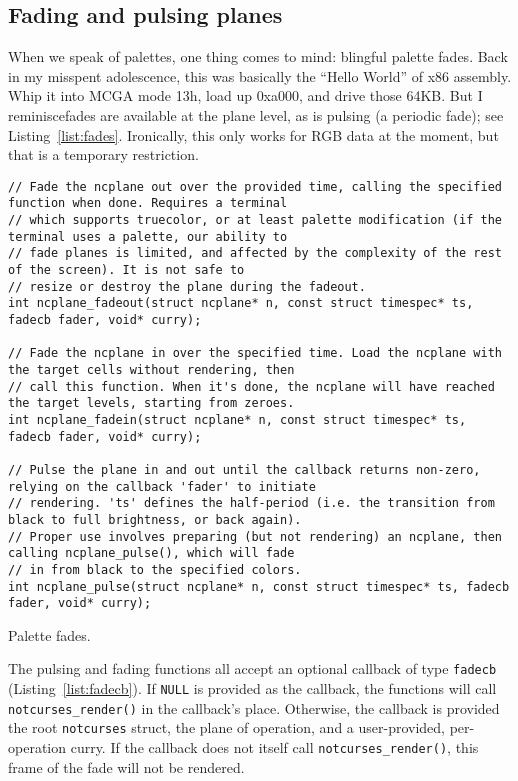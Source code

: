 \subsection{Fading and pulsing planes}
When we speak of palettes, one thing comes to mind: blingful palette fades.
Back in my misspent adolescence, this was basically the ``Hello World'' of
x86 assembly. Whip it into MCGA mode 13h, load up 0xa000, and drive those
64KB. But I reminisce\textellipsis fades are available at the plane level,
as is pulsing (a periodic fade); see Listing~\ref{list:fades}. Ironically,
this only works for RGB data at the moment, but that is a temporary restriction.

\begin{listing}[!htb]
\begin{verbatim}
// Fade the ncplane out over the provided time, calling the specified function when done. Requires a terminal
// which supports truecolor, or at least palette modification (if the terminal uses a palette, our ability to
// fade planes is limited, and affected by the complexity of the rest of the screen). It is not safe to
// resize or destroy the plane during the fadeout.
int ncplane_fadeout(struct ncplane* n, const struct timespec* ts, fadecb fader, void* curry);

// Fade the ncplane in over the specified time. Load the ncplane with the target cells without rendering, then
// call this function. When it's done, the ncplane will have reached the target levels, starting from zeroes.
int ncplane_fadein(struct ncplane* n, const struct timespec* ts, fadecb fader, void* curry);

// Pulse the plane in and out until the callback returns non-zero, relying on the callback 'fader' to initiate
// rendering. 'ts' defines the half-period (i.e. the transition from black to full brightness, or back again).
// Proper use involves preparing (but not rendering) an ncplane, then calling ncplane_pulse(), which will fade
// in from black to the specified colors.
int ncplane_pulse(struct ncplane* n, const struct timespec* ts, fadecb fader, void* curry);
\end{verbatim}
\caption{Palette fades.}
\label{list:fades}
\end{listing}

The pulsing and fading functions all accept an optional callback of type
\texttt{fadecb} (Listing~\ref{list:fadecb}). If \texttt{NULL} is provided as
the callback, the functions will call \texttt{notcurses\_render()} in the
callback's place. Otherwise, the callback is provided the root
\texttt{notcurses} struct, the plane of operation, and a user-provided,
per-operation curry. If the callback does not itself call
\texttt{notcurses\_render()}, this frame of the fade will not be rendered.

